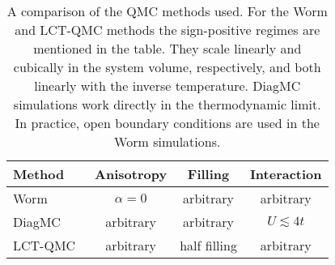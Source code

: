 \documentclass[twocolumn,superscriptaddress,pra,showpacs,longbibliography]{revtex4-1}
\newcommand{\<}{\langle}
\renewcommand{\>}{\rangle}
\newcommand{\upcite}[1]{\textsuperscript{\cite{#1}}}
\begin{document}
\begin{table}
\caption{\label{tab:methods} A comparison of the QMC methods used. For the Worm and LCT-QMC methods the sign-positive regimes are mentioned in the table. They scale linearly and cubically in the system volume, respectively, and both linearly with the inverse temperature. DiagMC simulations work directly in the thermodynamic limit. In practice, open boundary conditions are used in the Worm simulations.}
\begin{tabular}{lccc}
\toprule
Method          & Anisotropy & Filling  & Interaction \\
\midrule 
Worm~\upcite{Prokofev1998,Pollet2007}       & $\alpha=0$ & arbitrary  & arbitrary \\
DiagMC~\upcite{VanHoucke2010, gukelberger2015diss}          & arbitrary & arbitrary   & $U \lesssim 4 t$ \\
LCT-QMC~\upcite{Iazzi:2015hi, 2015PhRvB..91w5151W}     & arbitrary & half filling &    arbitrary \\
 \bottomrule 
 \end{tabular}
\end{table}
\end{document}
